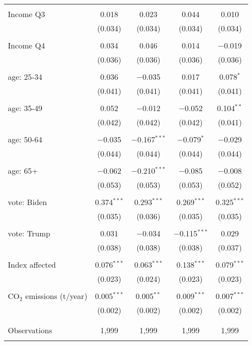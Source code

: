 \begin{tabular}{@{\extracolsep{5pt}}lcccc}
  & & & & \\ 
 Income Q3 & 0.018 & 0.023 & 0.044 & 0.010 \\ 
  & (0.034) & (0.034) & (0.034) & (0.034) \\ 
  & & & & \\ 
 Income Q4 & 0.034 & 0.046 & 0.014 & $-$0.019 \\ 
  & (0.036) & (0.036) & (0.036) & (0.036) \\ 
  & & & & \\ 
 age: 25-34 & 0.036 & $-$0.035 & 0.017 & 0.078$^{*}$ \\ 
  & (0.041) & (0.041) & (0.041) & (0.041) \\ 
  & & & & \\ 
 age: 35-49 & 0.052 & $-$0.012 & $-$0.052 & 0.104$^{**}$ \\ 
  & (0.042) & (0.042) & (0.042) & (0.041) \\ 
  & & & & \\ 
 age: 50-64 & $-$0.035 & $-$0.167$^{***}$ & $-$0.079$^{*}$ & $-$0.029 \\ 
  & (0.044) & (0.044) & (0.044) & (0.044) \\ 
  & & & & \\ 
 age: 65+ & $-$0.062 & $-$0.210$^{***}$ & $-$0.085 & $-$0.008 \\ 
  & (0.053) & (0.053) & (0.053) & (0.052) \\ 
  & & & & \\ 
 vote: Biden & 0.374$^{***}$ & 0.293$^{***}$ & 0.269$^{***}$ & 0.325$^{***}$ \\ 
  & (0.035) & (0.036) & (0.035) & (0.035) \\ 
  & & & & \\ 
 vote: Trump & 0.031 & $-$0.034 & $-$0.115$^{***}$ & 0.029 \\ 
  & (0.038) & (0.038) & (0.038) & (0.037) \\ 
  & & & & \\ 
 Index affected & 0.076$^{***}$ & 0.063$^{***}$ & 0.138$^{***}$ & 0.079$^{***}$ \\ 
  & (0.023) & (0.024) & (0.023) & (0.023) \\ 
  & & & & \\ 
 CO$_{2}$ emissions (t/year) & 0.005$^{***}$ & 0.005$^{**}$ & 0.009$^{***}$ & 0.007$^{***}$ \\ 
  & (0.002) & (0.002) & (0.002) & (0.002) \\ 
  & & & & \\ 
\hline \\[-1.8ex] 

Observations & 1,999 & 1,999 & 1,999 & 1,999 \\ 
\hline 
\hline \\[-1.8ex] 
\end{tabular} 